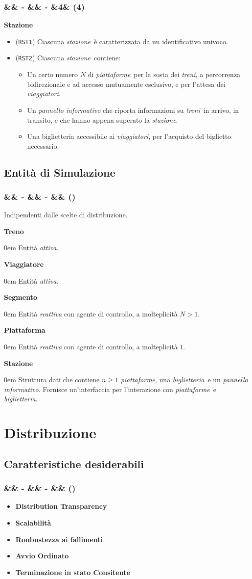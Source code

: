 \documentclass[slidestop,compress,blackandwhite]{beamer}
\newcommand{\itemB}[3]{
	\item \textbf{#1} #2 \vspace{#3}
}
\newcommand{\ttt}[1]{\texttt{#1}}
\newcommand{\ii}[1]{\textit{#1}}
\newcommand{\treni}{\ii{treni}}
\newcommand{\viaggiatori}{\ii{viaggiatori}}
\newcommand{\stazione}{\ii{stazione}}
\newcommand{\piattaforme}{\ii{piattaforme}}
\newcommand{\biglietteria}{\ii{biglietteria}}
\newcommand{\describe}[2]{
	\textbf{#1}\\
	\begin{addmargin}[2em]{0em}
		#2
	\end{addmargin}
}
\newcommand{\newtitle}[4]{
	#1 
	\ifx&#2&%
	\else
  		\large- #2
	\fi
	\ifx&#3&%
	\else
  		\normalsize- #3
	\fi
	\ifx&#4&%
	\else
  		\normalsize (#4)
	\fi
}
\newcommand{\newframe}[5]{
	\begin{frame}
		\frametitle{\newtitle{#1}{#2}{#3}{#4}}
		#5
	\end{frame}
}
\newcommand{\itemt}[1]{\item (\ttt{#1})}
\begin{document}
	\newframe{}{}{}{4}{
		\vspace{0.5cm}
		\textbf{Stazione}
		\begin{itemize}
			\itemt{RST1} Ciascuna \stazione~è caratterizzata da un identificativo univoco.
			\itemt{RST2} Ciascuna \stazione~contiene:
				\begin{itemize}
					\item Un certo numero $N$ di \piattaforme~per la sosta dei \treni, a percorrenza bidirezionale e ad accesso mutuamente esclusivo, e per l'attesa dei \viaggiatori.
					\item Un \ii{pannello informativo} che riporta informazioni su \treni~in arrivo, in transito, e che hanno appena superato la \stazione.
					\item Una biglietteria accessibile ai \viaggiatori, per l'acquisto del biglietto necessario.
				\end{itemize}
		\end{itemize} 
	}


	
	\subsection{Entità di Simulazione}\label{entities}

	\newframe{}{}{}{}{
		Indipendenti dalle scelte di distribuzione.
		
		\vspace{0.2cm}
		\describe{Treno}{Entità \ii{attiva}.}
	
		\describe{Viaggiatore}{Entità \ii{attiva}.}
		
		\describe{Segmento}{Entità \ii{reattiva} con agente di controllo, a molteplicità $N>1$.}
		
		\describe{Piattaforma}{Entità \ii{reattiva} con agente di controllo, a molteplicità $1$.}
		
		\describe{Stazione}{Struttura dati che contiene $n\ge1$ \piattaforme, una \biglietteria~e un \ii{pannello informativo}. Fornisce un'interfaccia per l'interazione con \piattaforme~e \biglietteria.}
	}


\section{Distribuzione}\label{distr}

	\subsection{Caratteristiche desiderabili}\label{characteristics}
	\newframe{}{}{}{}{
		\vspace{0.5cm}
		\begin{itemize}
			\itemB{Distribution Transparency}{}{0.6cm}
			\itemB{Scalabilità}{}{0.6cm} 
			\itemB{Roubustezza ai fallimenti}{}{0.6cm} 
			\itemB{Avvio Ordinato}{}{0.6cm} 
			\itemB{Terminazione in stato Consitente}{}{0.6cm}
		\end{itemize}
	}
	
\end{document}
